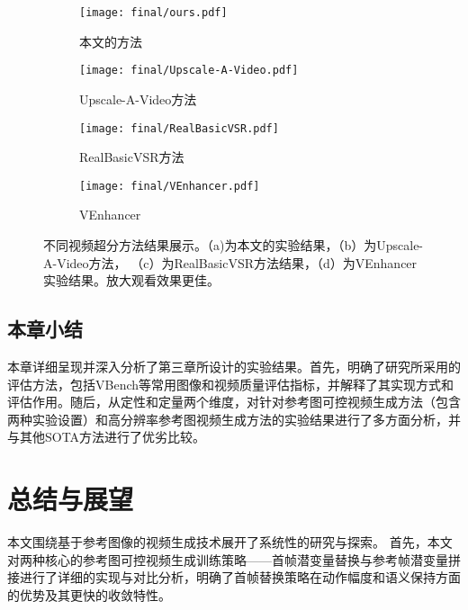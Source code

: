 \begin{figure}[H]
    \centering
    \begin{subfigure}[b]{0.9\textwidth}
        \texttt{[image: final/ours.pdf]}
        \caption{本文的方法}
        \label{fig:ours}
    \end{subfigure}

    \vspace{0.5em} %

    \begin{subfigure}[b]{0.3\textwidth}
        \texttt{[image: final/Upscale-A-Video.pdf]}
        \caption{Upscale-A-Video方法}
        \label{fig:upscale}
    \end{subfigure}
    \hfill
    \begin{subfigure}[b]{0.3\textwidth}
        \texttt{[image: final/RealBasicVSR.pdf]}
        \caption{RealBasicVSR方法}
        \label{fig:rbvsr}
    \end{subfigure}
    \hfill
    \begin{subfigure}[b]{0.3\textwidth}
        \texttt{[image: final/VEnhancer.pdf]}
        \caption{VEnhancer}
        \label{fig:venhancer方法}
    \end{subfigure}

    \caption{不同视频超分方法结果展示。（a)为本文的实验结果，（b）为Upscale-A-Video方法， （c）为RealBasicVSR方法结果，（d）为VEnhancer实验结果。放大观看效果更佳。}
    \label{fig:vsrcompare}
\end{figure}



\subsection{本章小结}
本章详细呈现并深入分析了第三章所设计的实验结果。首先，明确了研究所采用的评估方法，包括VBench等常用图像和视频质量评估指标，并解释了其实现方式和评估作用。随后，从定性和定量两个维度，对针对参考图可控视频生成方法（包含两种实验设置）和高分辨率参考图视频生成方法的实验结果进行了多方面分析，并与其他SOTA方法进行了优劣比较。

\cleardoublepage
\section{总结与展望}
本文围绕基于参考图像的视频生成技术展开了系统性的研究与探索。
首先，本文对两种核心的参考图可控视频生成训练策略——首帧潜变量替换与参考帧潜变量拼接进行了详细的实现与对比分析，明确了首帧替换策略在动作幅度和语义保持方面的优势及其更快的收敛特性。

